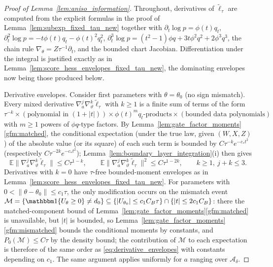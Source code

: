 \documentclass[11pt]{article}
\theoremstyle{definition}
\theoremstyle{plain}
\newcommand{\E}{\mathbb{E}}
\begin{document}
\begin{proof}[Proof of Lemma~\ref{lem:aniso_information}]
Throughout, derivatives of $\tilde\ell_\tau$ are computed from the explicit formulas in the proof of Lemma~\ref{lem:subexp_fixed_tau_new} together with $\partial_t\log p=\phi(t)q_t$, $\partial^2_t\log p=-t\phi(t)q_t-\phi(t)^2q_t^2$, $\partial^3_t\log p=(t^2-1)\phi q+3t\phi^2q^2+2\phi^3q^3$, the chain rule $\nabla_\theta=Z\tau^{-1}\partial_t$, and the bounded chart Jacobian. Differentiation under the integral is justified exactly as in Lemma~\ref{lem:score_hess_envelopes_fixed_tau_new}, the dominating envelopes now being those produced below.

Derivative envelopes. Consider first parameters with $\theta=\theta_0$ (no sign mismatch). Every mixed derivative $\nabla^j_a\nabla^k_\vartheta\tilde\ell_\tau$ with $k\ge1$ is a finite sum of terms of the form
$\tau^{-k}\times(\text{polynomial in }(1+|t|))\times\phi(t)^m q_t\text{-products}\times(\text{bounded data polynomials})$
with $m\ge1$ powers of $\phi q$-type factors. By Lemma~\ref{lem:gate_factor_moments}\ref{gfm:matched}, the conditional expectation (under the true law, given $(W,X,Z)$) of the absolute value (or its square) of each such term is bounded by $C\tau^{-k}e^{-c_*t^2}$ (respectively $C\tau^{-2k}e^{-c_*t^2}$); Lemma~\ref{lem:boundary_layer_integration}(i) then gives
\begin{equation}
\E\big\|\nabla^j_a\nabla^k_\vartheta\tilde\ell_\tau\big\|\le C\tau^{1-k},
\qquad
\E\big\|\nabla^j_a\nabla^k_\vartheta\tilde\ell_\tau\big\|^2\le C\tau^{1-2k},
\qquad k\ge1,\ j+k\le3 .
\label{eq:derivative_envelopes}
\end{equation}
Derivatives with $k=0$ have $\tau$-free bounded-moment envelopes as in Lemma~\ref{lem:score_hess_envelopes_fixed_tau_new}. For parameters with $0<\|\theta-\theta_0\|\le c_1\tau$, the only modification occurs on the mismatch event
$\mathcal M=\{\mathbbm 1\{U_\theta\ge0\}\neq d_0\}\subseteq\{|U_{\theta_0}|\le c_1C_B\tau\}\cap\{|t|\le2c_1C_B\}$:
there the matched-component bound of Lemma~\ref{lem:gate_factor_moments}\ref{gfm:matched} is unavailable, but $|t|$ is bounded, so Lemma~\ref{lem:gate_factor_moments}\ref{gfm:mismatched} bounds the conditional moments by constants, and $P_0(\mathcal M)\le C\tau$ by the density bound; the contribution of $\mathcal M$ to each expectation is therefore of the same order as \eqref{eq:derivative_envelopes} with constants depending on $c_1$. The same argument applies uniformly for $a$ ranging over $\mathcal A_\delta$.


\end{proof}
\end{document}
